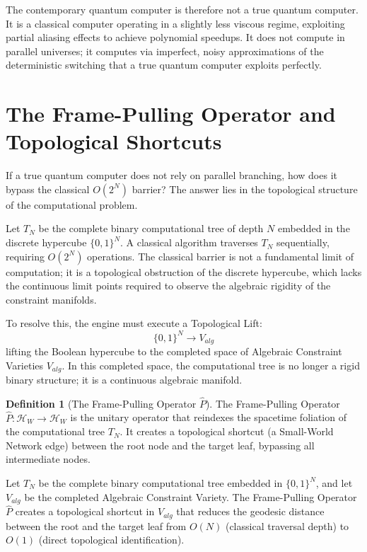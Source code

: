 \documentclass[12pt,twoside]{extbook}
\theoremstyle{definition}
\newtheorem{definition}{Definition}[chapter]
\theoremstyle{remark}
\begin{document}
The contemporary quantum computer is therefore not a true quantum computer. It is a classical computer operating in a slightly less viscous regime, exploiting partial aliasing effects to achieve polynomial speedups. It does not compute in parallel universes; it computes via imperfect, noisy approximations of the deterministic switching that a true quantum computer exploits perfectly.

\section{The Frame-Pulling Operator and Topological Shortcuts}
If a true quantum computer does not rely on parallel branching, how does it bypass the classical $O(2^N)$ barrier? The answer lies in the topological structure of the computational problem. 

Let $T_N$ be the complete binary computational tree of depth $N$ embedded in the discrete hypercube $\{0, 1\}^N$. A classical algorithm traverses $T_N$ sequentially, requiring $O(2^N)$ operations. The classical barrier is not a fundamental limit of computation; it is a topological obstruction of the discrete hypercube, which lacks the continuous limit points required to observe the algebraic rigidity of the constraint manifolds.

To resolve this, the engine must execute a Topological Lift:
\begin{equation}
\{0, 1\}^N \longrightarrow V_{alg}
\end{equation}
lifting the Boolean hypercube to the completed space of Algebraic Constraint Varieties $V_{alg}$. In this completed space, the computational tree is no longer a rigid binary structure; it is a continuous algebraic manifold.

\begin{definition}[The Frame-Pulling Operator $\hat{P}$]
The Frame-Pulling Operator $\hat{P}: \mathcal{H}_W \to \mathcal{H}_W$ is the unitary operator that reindexes the spacetime foliation of the computational tree $T_N$. It creates a topological shortcut (a Small-World Network edge) between the root node and the target leaf, bypassing all intermediate nodes.
\end{definition}

\begin{theorem}
Let $T_N$ be the complete binary computational tree embedded in $\{0, 1\}^N$, and let $V_{alg}$ be the completed Algebraic Constraint Variety. The Frame-Pulling Operator $\hat{P}$ creates a topological shortcut in $V_{alg}$ that reduces the geodesic distance between the root and the target leaf from $O(N)$ (classical traversal depth) to $O(1)$ (direct topological identification).
\end{theorem}
\end{document}
